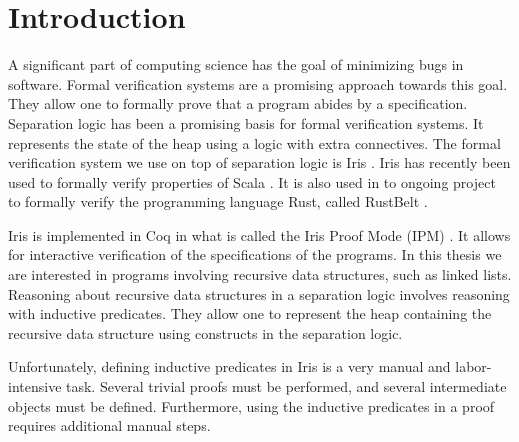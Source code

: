 \documentclass[thesis.tex]{subfiles}
\begin{document}
\chapter{Introduction}
\label{ch:introduction}


A significant part of computing science has the goal of minimizing bugs in software. Formal verification systems are a promising approach towards this goal. They allow one to formally prove that a program abides by a specification.
Separation logic \cite{ohearnLocalReasoningPrograms2001,reynoldsSeparationLogicLogic2002b} has been a promising basis for formal verification systems. It represents the state of the heap using a logic with extra connectives.
The formal verification system we use on top of separation logic is Iris \cite*{jungIrisMonoidsInvariants2015a,jungHigherorderGhostState2016,krebbersEssenceHigherOrderConcurrent2017,jungIrisGroundModular2018}.
Iris has recently been used to formally verify properties of Scala \cite{giarrussoScalaStepbystepSoundness2020}. It is also used in to ongoing project to formally verify the programming language Rust, called RustBelt \cite{jungRustBeltSecuringFoundations2017,dangRustBeltMeetsRelaxed2019,matsushitaRustHornBeltSemanticFoundation2022}.

Iris is implemented in Coq in what is called the Iris Proof Mode (IPM) \cite*{krebbersInteractiveProofsHigherorder2017,krebbersMoSeLGeneralExtensible2018}. It allows for interactive verification of the specifications of the programs. In this thesis we are interested in programs involving recursive data structures, such as linked lists. Reasoning about recursive data structures in a separation logic involves reasoning with inductive predicates. They allow one to represent the heap containing the recursive data structure using constructs in the separation logic.

Unfortunately, defining inductive predicates in Iris is a very manual and labor-intensive task. Several trivial proofs must be performed, and several intermediate objects must be defined. Furthermore, using the inductive predicates in a proof requires additional manual steps.
\end{document}
